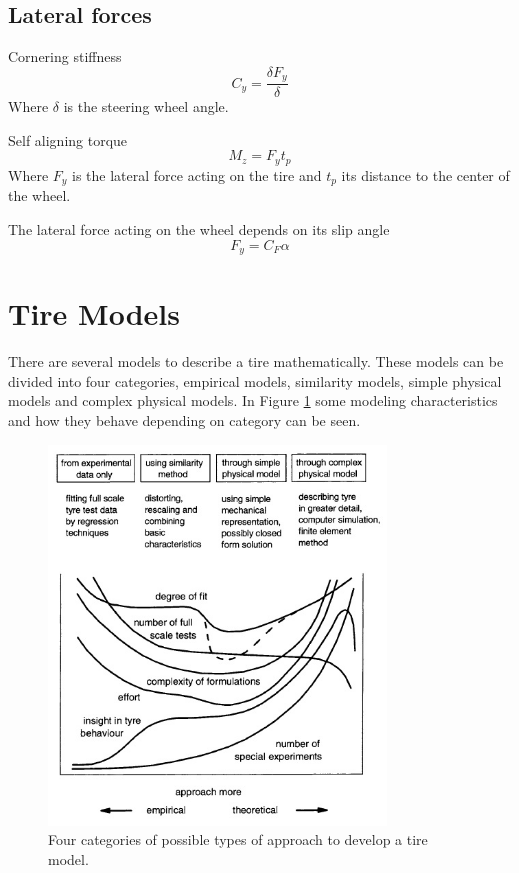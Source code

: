 \subsection{Lateral forces}

Cornering stiffness
\begin{equation}
	C_{y} = \frac{\delta F_{y}}{\delta}
\end{equation}
Where $\delta$ is the steering wheel angle.

Self aligning torque
\begin{equation}
	M_{z} = F_{y}t_{p}
\end{equation}
Where $ F_{y} $  is the lateral force acting on the tire and $ t_{p} $ its distance to the center of the wheel. 

The lateral force acting on the wheel depends on its slip angle
\begin{equation}
	F_{y}=C_{F}\alpha
\end{equation}

\section{Tire Models}

There are several models to describe a tire mathematically. These models can be divided into four categories, empirical models, similarity models, simple physical models and complex physical  models. In Figure \ref{tire_modeling} some modeling characteristics and how they behave depending on category can be seen.

\begin{figure}[h]
	\centering
	\includegraphics[width=0.8\textwidth]{Pictures/tire_modeling}
	\caption{Four categories of possible types of approach to develop a tire model. \cite{pacejka}}
	\label{tire_modeling}
\end{figure}


